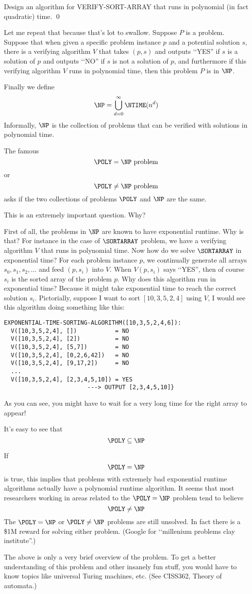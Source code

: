\begin{ex}
Design an algorithm for VERIFY-SORT-ARRAY that runs in 
polynomial (in fact quadratic) time.
\qed
\end{ex}

Let me repeat that because that's lot to swallow.
Suppose $P$ is a problem.
Suppose that when given a specific problem instance $p$
and a potential solution $s$,
there is a verifying algorithm $V$ that takes $(p, s)$ and outputs 
\lq\lq YES'' if $s$ is a solution of $p$
and outputs \lq\lq NO'' if $s$ is not a solution of $p$,
and furthermore if this verifying algorithm $V$ runs in polynomial time,
then this problem $P$ is in $\NP$.


Finally we define
\[
\NP = \bigcup_{d = 0}^\infty \NTIME(n^d)
\]
Informally, $\NP$ is the collection of problems that can be
verified with solutions in polynomial time.

The famous
\[
\POLY = \NP \text{ problem}
\]
or 
\[
\POLY \neq \NP \text{ problem}
\]
asks if the two collections of problems $\POLY$ and $\NP$ are the same.

This is an extremely important question.
Why?

First of all, the problems in $\NP$ are known to have exponential runtime.
Why is that?
For instance in the case of $\SORTARRAY$ problem, we have a 
verifying algorithm $V$ that runs in polynomial time.
Now how do we solve $\SORTARRAY$ in exponential time?
For each problem instance $p$, we continually generate all arrays
$s_0, s_1, s_2, \ldots$ and feed $(p, s_i)$ into $V$.
When $V(p, s_i)$ says \lq\lq YES'', then of course $s_i$ is the
sorted array of the problem $p$.
Why does this algorithm run in exponential time?
Because it might take exponential time to reach the correct solution 
$s_i$.
Pictorially, suppose I want to sort $[10,3,5,2,4]$ using $V$,
I would see this algorithm doing something like this:
\begin{Verbatim}[frame=single,fontsize=\footnotesize]
EXPONENTIAL-TIME-SORTING-ALGORITHM([10,3,5,2,4,6]):
  V([10,3,5,2,4], [])           = NO  
  V([10,3,5,2,4], [2])          = NO  
  V([10,3,5,2,4], [5,7])        = NO  
  V([10,3,5,2,4], [0,2,6,42])   = NO 
  V([10,3,5,2,4], [9,17,2])     = NO 
  ...
  V([10,3,5,2,4], [2,3,4,5,10]) = YES 
                        ---> OUTPUT [2,3,4,5,10]} 
\end{Verbatim}
As you can see, you might have to wait for a very long time for the 
right array to appear!

It's easy to see that 
\[
\POLY \subseteq \NP
\]

If 
\[
\POLY = \NP
\]
is true, this implies that problems with extremely bad exponential runtime
algorithms actually have a polynomial runtime algorithm.
It seems that most researchers working in areas related to 
the $\POLY = \NP$ problem tend to believe
\[
\POLY \neq \NP
\]
The $\POLY = \NP$ or $\POLY \neq \NP$ problems are still unsolved.
In fact there is a \$1M reward for solving either problem.
(Google for \lq\lq millenium problems clay institute''.) 

The above is only a very brief overview of the problem.
To get a better understanding of this problem and other insanely fun
stuff, you would have to 
know topics like universal Turing machines, etc.
(See CISS362, Theory of automata.)
